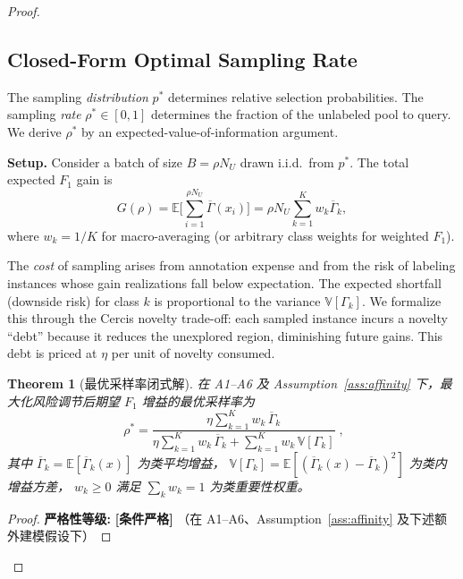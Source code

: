 \documentclass[12pt,a4paper]{article}
\newtheorem{theorem}{Theorem}[section]
\newcommand{\E}{\mathbb{E}}
\newcommand{\V}{\mathbb{V}}
\newcommand{\conditionallyrigorous}{\textbf{[条件严格]}}
\begin{document}
\begin{proof}
\subsection{Closed-Form Optimal Sampling Rate}

The sampling \emph{distribution} $p^*$ determines relative selection
probabilities.  The sampling \emph{rate} $\rho^*\in[0,1]$ determines the
fraction of the unlabeled pool to query.  We derive $\rho^*$ by an
expected-value-of-information argument.

\medskip\noindent
\textbf{Setup.}
Consider a batch of size $B=\rho N_U$ drawn i.i.d.\ from $p^*$.
The total expected $F_1$ gain is
\begin{equation}\label{eq:total-gain}
    G(\rho) = \E\Big[\sum_{i=1}^{\rho N_U} \overline{\Gamma}(x_i)\Big]
    = \rho N_U\sum_{k=1}^K w_k\overline{\Gamma}_k,
\end{equation}
where $w_k=1/K$ for macro-averaging (or arbitrary class weights for
weighted $F_1$).

The \emph{cost} of sampling arises from annotation expense and from the
risk of labeling instances whose gain realizations fall below expectation.
The expected shortfall (downside risk) for class $k$ is proportional to
the variance $\V[\Gamma_k]$.  We formalize this through the Cercis novelty
trade-off: each sampled instance incurs a novelty ``debt'' because it
reduces the unexplored region, diminishing future gains.  This
debt is priced at $\eta$ per unit of novelty consumed.

\begin{theorem}[最优采样率闭式解]
\label{thm:optimal-rate}
在 A1--A6 及 Assumption~\ref{ass:affinity} 下，最大化风险调节后期望 $F_1$ 增益的最优采样率为
\begin{equation}\label{eq:rho-star}
    \boxed{\;
    \rho^* =
    \frac{\eta\displaystyle\sum_{k=1}^{K} w_k\,\overline{\Gamma}_k}
         {\eta\displaystyle\sum_{k=1}^{K} w_k\,\overline{\Gamma}_k
          + \displaystyle\sum_{k=1}^{K} w_k\,\V[\Gamma_k]}
    \;},
\end{equation}
其中 $\overline{\Gamma}_k=\E[\overline{\Gamma}_k(x)]$ 为类平均增益，
$\V[\Gamma_k]=\E[(\overline{\Gamma}_k(x)-\overline{\Gamma}_k)^2]$ 为类内增益方差，
$w_k\geq0$ 满足 $\sum_k w_k=1$ 为类重要性权重。
\end{theorem}

\begin{proof}
\textbf{严格性等级:} \conditionallyrigorous
\quad（在 A1--A6、Assumption~\ref{ass:affinity} 及下述额外建模假设下）


\end{proof}
\end{proof}
\end{document}
